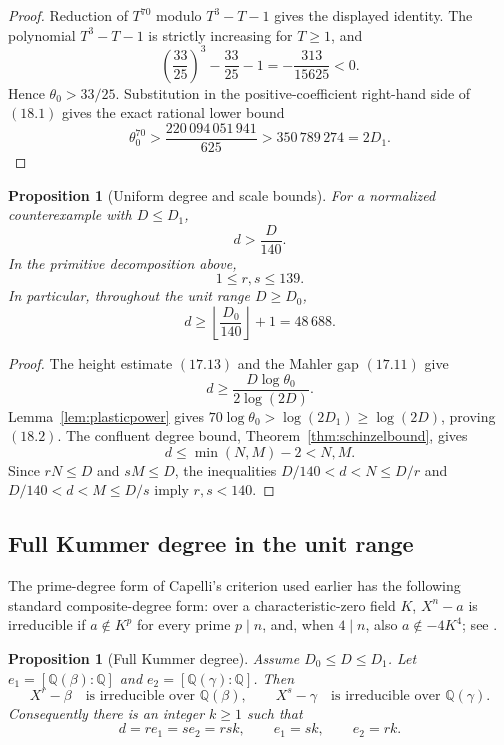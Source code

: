 \documentclass[11pt]{article}
\newtheorem{proposition}[theorem]{Proposition}
\theoremstyle{definition}
\newcommand{\Q}{\mathbb Q}
\begin{document}
\begin{proof}
Reduction of \(T^{70}\) modulo \(T^3-T-1\) gives the displayed identity.
The polynomial \(T^3-T-1\) is strictly increasing for \(T\geq1\), and
\[
 \left(\frac{33}{25}\right)^3-\frac{33}{25}-1
 =-\frac{313}{15625}<0.
\]
Hence \(\theta_0>33/25\).  Substitution in the positive-coefficient
right-hand side of \((18.1)\) gives the exact rational lower bound
\[
 \theta_0^{70}>
 \frac{220\,094\,051\,941}{625}
 >350\,789\,274=2D_1.
\]
\end{proof}

\begin{proposition}[Uniform degree and scale bounds]
\label{prop:uniformdegree}
For a normalized counterexample with \(D\leq D_1\),
\begin{equation}
 d>\frac D{140}.
 \tag{18.2}
\end{equation}
In the primitive decomposition above,
\begin{equation}
 1\leq r,s\leq139.
 \tag{18.3}
\end{equation}
In particular, throughout the unit range \(D\geq D_0\),
\[
 d\geq\left\lfloor\frac{D_0}{140}\right\rfloor+1=48\,688.
\]
\end{proposition}

\begin{proof}
The height estimate \((17.13)\) and the Mahler gap \((17.11)\) give
\[
 d\geq\frac{D\log\theta_0}{2\log(2D)}.
\]
Lemma~\ref{lem:plasticpower} gives
\(70\log\theta_0>\log(2D_1)\geq\log(2D)\), proving \((18.2)\).
The confluent degree bound, Theorem~\ref{thm:schinzelbound}, gives
\[
 d\leq\min(N,M)-2<N,M.
\]
Since \(rN\leq D\) and \(sM\leq D\), the inequalities
\(D/140<d<N\leq D/r\) and \(D/140<d<M\leq D/s\) imply
\(r,s<140\).
\end{proof}

\subsection{Full Kummer degree in the unit range}

The prime-degree form of Capelli's criterion used earlier has the following
standard composite-degree form: over a characteristic-zero field \(K\),
\(X^n-a\) is irreducible if \(a\notin K^p\) for every prime \(p\mid n\),
and, when \(4\mid n\), also \(a\notin-4K^4\); see
\cite[Chapter~VI, Section~9]{LangAlgebra}.

\begin{proposition}[Full Kummer degree]
\label{prop:unitkummer}
Assume \(D_0\leq D\leq D_1\).  Let \(e_1=[\Q(\beta):\Q]\) and
\(e_2=[\Q(\gamma):\Q]\).  Then
\[
 X^r-\beta\quad\text{is irreducible over }\Q(\beta),
 \qquad
 X^s-\gamma\quad\text{is irreducible over }\Q(\gamma).
\]
Consequently there is an integer \(k\geq1\) such that
\begin{equation}
 d=re_1=se_2=rsk,
 \qquad e_1=sk,
 \qquad e_2=rk.
 \tag{18.4}
\end{equation}
\end{proposition}
\end{document}
